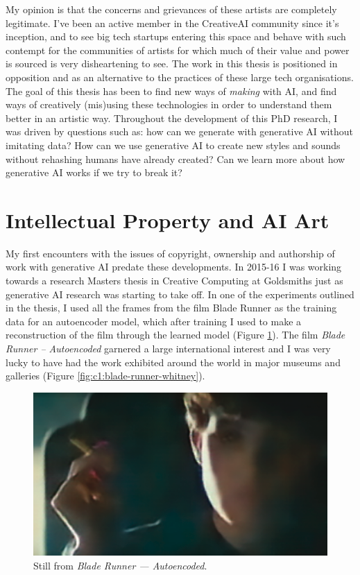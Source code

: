 My opinion is that the concerns and grievances of these artists are completely legitimate. 
I've been an active member in the CreativeAI community since it’s inception, and to see big tech startups entering this space and behave with such contempt for the communities of artists for which much of their value and power is sourced is very disheartening to see. 
The work in this thesis is positioned in opposition and as an alternative to the practices of these large tech organisations. 
The goal of this thesis has been to find new ways of \textit{making} with AI, and find ways of creatively (mis)using these technologies in order to understand them better in an artistic way.
Throughout the development of this PhD research, I was driven by questions such as: how can we generate with generative AI without imitating data? 
How can we use generative AI to create new styles and sounds without rehashing humans have already created?
Can we learn more about how generative AI works if we try to break it?

\section{Intellectual Property and AI Art}

My first encounters with the issues of copyright, ownership and authorship of work with generative AI predate these developments. 
In 2015-16 I was working towards a research Masters thesis in Creative Computing at Goldsmiths just as generative AI research was starting to take off. 
In one of the experiments outlined in the thesis, I used all the frames from the film Blade Runner as the training data for an autoencoder model, which after training I used to make a reconstruction of the film through the learned model \citep{broad2016autoencoding} (Figure \ref{fig:c1:blade-runner}).
The film \textit{Blade Runner -- Autoencoded} garnered a large international interest and I was very lucky to have had the work exhibited around the world in major museums and galleries \citep{broad2017autoencoding} (Figure \ref{fig:c1:blade-runner-whitney}).

\begin{figure}[!htb]
    \centering
    \captionsetup{justification=centering}
    \includegraphics[width=1\textwidth]{figures/c1_intro/blade_runner_still.png}
    \caption{Still from \textit{Blade Runner --- Autoencoded}.}
    \label{fig:c1:blade-runner}
\end{figure}


